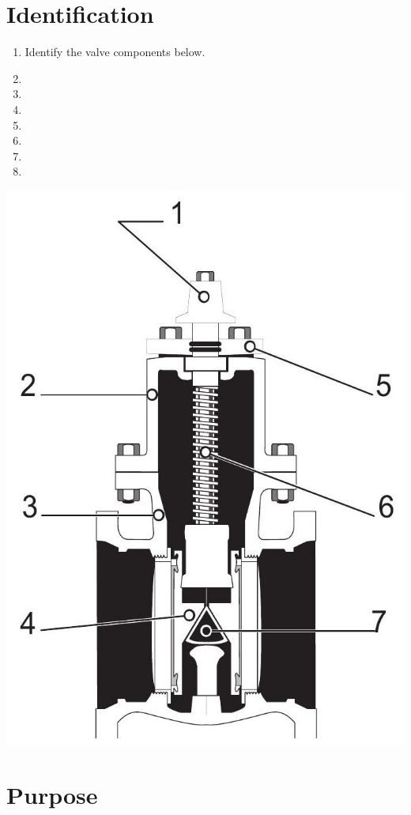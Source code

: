 \documentclass[10pt]{article}
\begin{document}
\section{Identification}
\begin{enumerate}
  \item Identify the valve components below.

  \item 
  \item 
  \item 
  \item 
  \item 
  \item 
  \item 
\end{enumerate}
\includegraphics[max width=\textwidth]{2022_11_03_fc0cbc2f3612fab6edd2g-20(4)}

\section{Purpose}
\end{document}
